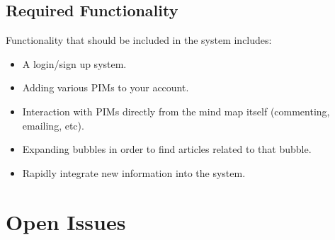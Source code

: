\documentclass[hidelinks,english]{article}
\begin{document}
		\subsection{Required Functionality}
			Functionality that should be included in the system includes:
			\begin{itemize}
			\item A login/sign up system. 
			\item Adding various PIMs to your account.
			\item Interaction with PIMs directly from the mind map itself (commenting, emailing, etc).
			\item Expanding bubbles in order to find articles related to that bubble.
			\item Rapidly integrate new information into the system.
			\end{itemize}
	
	\section{Open Issues}
	
\end{document}
